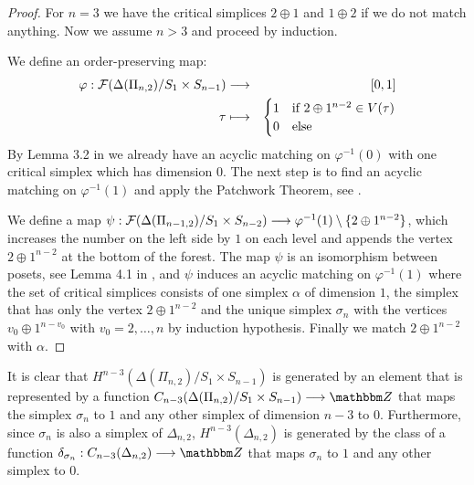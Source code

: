 \documentclass{elsarticle}
\def\Z{\mathbbm Z}
\begin{document}
\begin{proof}
For $n=3$ we have the critical simplices $2\oplus1$ and $1\oplus2$ if we do not match anything. Now we assume $n>3$ and proceed by induction.

We define an order-preserving map:
\begin{eqnarray*}
\varphi:{\cal F}(\Delta(\Pi_{n,2})/S_1\times S_{n-1})&\longrightarrow&[0,1]\\
\tau&\longmapsto&
\begin{cases}
1&\text{if $2\oplus 1^{n-2}\in V(\tau)$}\\
0&\text{else}
\end{cases}
\end{eqnarray*}
By Lemma 3.2 in \cite{donau} we already have an acyclic matching on $\varphi^{-1}(0)$ with one critical simplex which has dimension $0$. The next step is to find an acyclic matching on $\varphi^{-1}(1)$ and apply the Patchwork Theorem, see \cite[Chapter 11]{buch}.

We define a map $\psi:{\cal F}(\Delta(\Pi_{n-1,2})/S_1\times S_{n-2})\longrightarrow\varphi^{-1}(1)\setminus\{2\oplus 1^{n-2}\}$, which increases the number on the left side by $1$ on each level and appends the vertex $2\oplus 1^{n-2}$ at the bottom of the forest. The map $\psi$ is an isomorphism between posets, see Lemma 4.1 in \cite{donau}, and $\psi$ induces an acyclic matching on $\varphi^{-1}(1)$ where the set of critical simplices consists of one simplex $\alpha$ of dimension $1$, the simplex that has only the vertex $2\oplus 1^{n-2}$ and the unique simplex $\sigma_n$ with the vertices $v_0\oplus 1^{n-v_0}$ with $v_0=2,\dots,n$ by induction hypothesis. Finally we match $2\oplus 1^{n-2}$ with $\alpha$.
\end{proof}
It is clear that $H^{n-3}(\Delta(\Pi_{n,2})/S_1\times S_{n-1})$ is generated by an element that is represented by a function $C_{n-3}(\Delta(\Pi_{n,2})/S_1\times S_{n-1})\longrightarrow\Z$ that maps the simplex $\sigma_n$ to $1$ and any other simplex of dimension $n-3$ to $0$. Furthermore, since $\sigma_n$ is also a simplex of $\Delta_{n,2}$, $H^{n-3}(\Delta_{n,2})$ is generated by the class of a function $\delta_{\sigma_n}:C_{n-3}(\Delta_{n,2})\longrightarrow\Z$ that maps $\sigma_n$ to $1$ and any other simplex to $0$.
\end{document}
